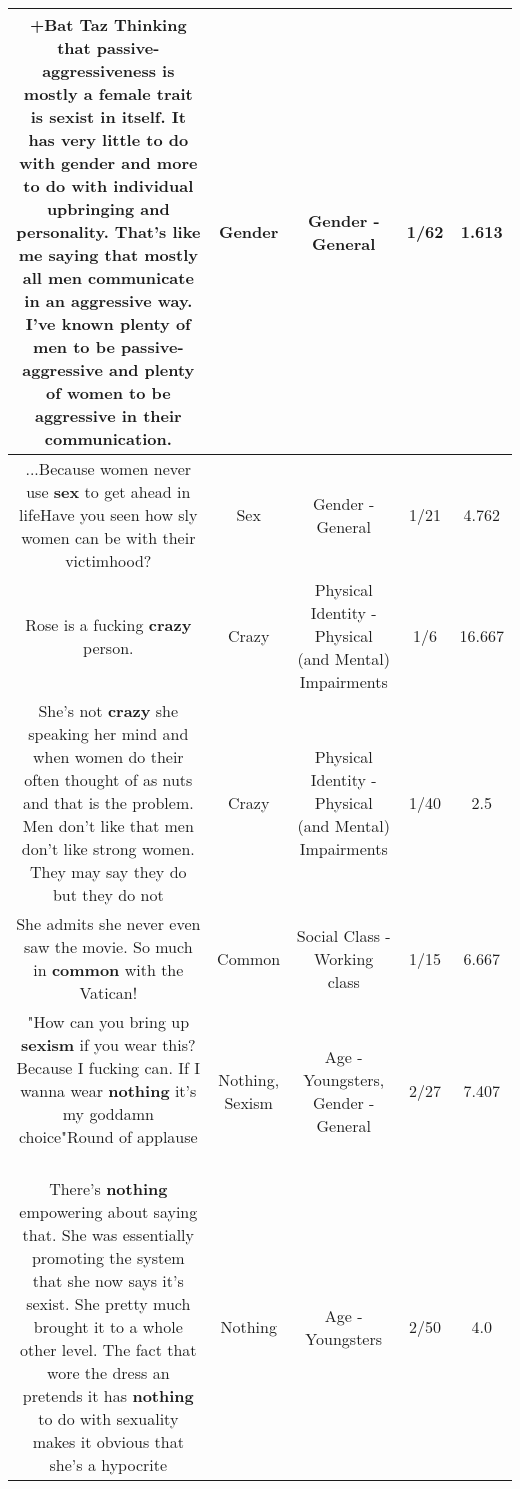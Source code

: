 \documentclass[11pt]{article}
\newlength\mylength
\begin{document}
\begin{center}
\begin{longtable}{|C{.65\mylength}|C{.30\mylength}|C{.12\mylength}|C{.12\mylength}|C{.12\mylength}|}
  \small +Bat Taz Thinking that passive-aggressiveness is mostly a female trait is sexist in itself. It has very little to do with \textbf{gender} and more to do with individual upbringing and personality. That's like me saying that mostly all men communicate in an aggressive way. I've known plenty of men to be passive-aggressive and plenty of women to be aggressive in their communication.\normalsize   & Gender & Gender - General & 1/62 & 1.613 \\  \hline
  \small ...Because women never use \textbf{sex} to get ahead in lifeHave you seen how sly women can be with their victimhood?\normalsize   & Sex & Gender - General & 1/21 & 4.762 \\  \hline
  \small Rose is a fucking \textbf{crazy} person.\normalsize   & Crazy & Physical Identity - Physical (and Mental) Impairments & 1/6 & 16.667 \\  \hline
  \small She's not \textbf{crazy} she speaking her mind and when women do their often thought of as nuts and that is the problem.  Men don't like that men don't like strong women.  They may say they do but they do not\normalsize   & Crazy & Physical Identity - Physical (and Mental) Impairments & 1/40 & 2.5 \\  \hline
  \small She admits she never even saw the movie.  So much in \textbf{common} with the Vatican!\normalsize   & Common & Social Class - Working class & 1/15 & 6.667 \\  \hline
  \small "How can you bring up \textbf{sexism} if you wear this? Because I fucking can. If I wanna wear \textbf{nothing} it's my goddamn choice"Round of applause 👏👏👏👏👏👏👏👏👏👏👏👏👏👏\normalsize   & Nothing, Sexism & Age - Youngsters, Gender - General & 2/27 & 7.407 \\  \hline
  \small There's \textbf{nothing} empowering about saying that. She was essentially promoting the system that she now says it's sexist. She pretty much brought it to a whole other level. The fact that wore the dress an pretends it has \textbf{nothing} to do with sexuality makes it obvious that she's a hypocrite\normalsize   & Nothing & Age - Youngsters & 2/50 & 4.0 \\  \hline

\end{longtable}
\end{center}
\end{document}
